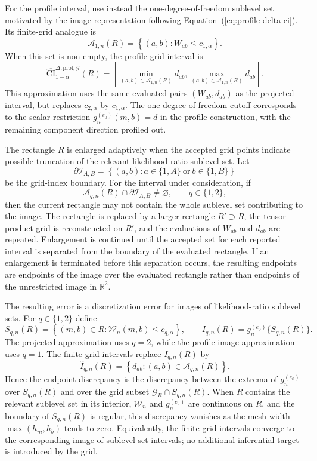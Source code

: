 \documentclass[11pt]{article}
\begin{document}
For the profile interval, use instead the one-degree-of-freedom sublevel set motivated by the image representation following Equation~(\ref{eq:profile-delta-ci}). Its finite-grid analogue is
\[
  \mathcal{A}_{1,n}(R)
  =
  \left\{
    (a,b):
    W_{ab}\leq c_{1,\alpha}
  \right\}.
\]
When this set is non-empty, the profile grid interval is
\[
  \widehat{\mathrm{CI}}^{\Delta,\mathrm{prof},\mathcal{G}}_{1-\alpha}(R)
  =
  \left[
    \min_{(a,b)\in\mathcal{A}_{1,n}(R)} d_{ab},
    \max_{(a,b)\in\mathcal{A}_{1,n}(R)} d_{ab}
  \right].
\]
This approximation uses the same evaluated pairs $(W_{ab},d_{ab})$ as the projected interval, but replaces $c_{2,\alpha}$ by $c_{1,\alpha}$. The one-degree-of-freedom cutoff corresponds to the scalar restriction $g_n^{(e_0)}(m,b)=d$ in the profile construction, with the remaining component direction profiled out.

The rectangle $R$ is enlarged adaptively when the accepted grid points indicate possible truncation of the relevant likelihood-ratio sublevel set. Let
\[
  \partial\mathcal{I}_{A,B}
  =
  \left\{
    (a,b):
    a\in\{1,A\}\ \text{or}\ b\in\{1,B\}
  \right\}
\]
be the grid-index boundary. For the interval under consideration, if
\[
  \mathcal{A}_{q,n}(R)\cap\partial\mathcal{I}_{A,B}\neq\varnothing,
  \qquad q\in\{1,2\},
\]
then the current rectangle may not contain the whole sublevel set contributing to the image. The rectangle is replaced by a larger rectangle $R'\supset R$, the tensor-product grid is reconstructed on $R'$, and the evaluations of $W_{ab}$ and $d_{ab}$ are repeated. Enlargement is continued until the accepted set for each reported interval is separated from the boundary of the evaluated rectangle. If an enlargement is terminated before this separation occurs, the resulting endpoints are endpoints of the image over the evaluated rectangle rather than endpoints of the unrestricted image in $\mathbb{R}^2$.

The resulting error is a discretization error for images of likelihood-ratio sublevel sets. For $q\in\{1,2\}$ define
\[
  S_{q,n}(R)
  =
  \left\{
    (m,b)\in R:
    \mathcal{W}_n(m,b)\leq c_{q,\alpha}
  \right\},
  \qquad
  I_{q,n}(R)=g_n^{(e_0)}\{S_{q,n}(R)\}.
\]
The projected approximation uses $q=2$, while the profile image approximation uses $q=1$. The finite-grid intervals replace $I_{q,n}(R)$ by
\[
  \widehat{I}_{q,n}(R)
  =
  \left\{
    d_{ab}:
    (a,b)\in\mathcal{A}_{q,n}(R)
  \right\}.
\]
Hence the endpoint discrepancy is the discrepancy between the extrema of $g_n^{(e_0)}$ over $S_{q,n}(R)$ and over the grid subset $\mathcal{G}_R\cap S_{q,n}(R)$. When $R$ contains the relevant sublevel set in its interior, $\mathcal{W}_n$ and $g_n^{(e_0)}$ are continuous on $R$, and the boundary of $S_{q,n}(R)$ is regular, this discrepancy vanishes as the mesh width $\max(h_m,h_b)$ tends to zero. Equivalently, the finite-grid intervals converge to the corresponding image-of-sublevel-set intervals; no additional inferential target is introduced by the grid.
\clearpage


\end{document}
